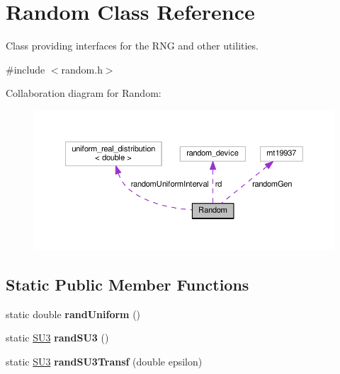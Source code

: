 \hypertarget{classRandom}{}\section{Random Class Reference}
\label{classRandom}


Class providing interfaces for the R\+NG and other utilities.  




{\ttfamily \#include $<$random.\+h$>$}



Collaboration diagram for Random\+:\nopagebreak
\begin{figure}[H]
\begin{center}
\leavevmode
\includegraphics[width=350pt]{dc/d73/classRandom__coll__graph}
\end{center}
\end{figure}
\subsection*{Static Public Member Functions}
\begin{DoxyCompactItemize}
\item 
static double {\bfseries rand\+Uniform} ()\hypertarget{classRandom_a85d1fc4b7dd6a2a659c02101a87f7a46}{}\label{classRandom_a85d1fc4b7dd6a2a659c02101a87f7a46}

\item 
static \hyperlink{structSU3}{S\+U3} {\bfseries rand\+S\+U3} ()\hypertarget{classRandom_ac5292fc838c1321ef8657947456a3970}{}\label{classRandom_ac5292fc838c1321ef8657947456a3970}

\item 
static \hyperlink{structSU3}{S\+U3} {\bfseries rand\+S\+U3\+Transf} (double epsilon)\hypertarget{classRandom_a1999be7abe21383e442a5ef96fe836f4}{}\label{classRandom_a1999be7abe21383e442a5ef96fe836f4}

\end{DoxyCompactItemize}
